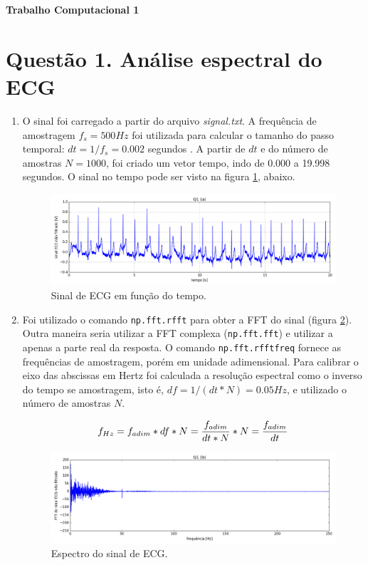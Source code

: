 \documentclass[12pt,letterpaper]{article}
\newcommand\hwnumber{1}
\begin{document}
\centerline{\textbf{\Large Trabalho Computacional \hwnumber}}

\centerline{}

\section*{Questão 1. Análise espectral do ECG}
\begin{enumerate}[label=(\alph*)]  %
    \item O sinal foi carregado a partir do arquivo \emph{signal.txt}. A frequência de amostragem ${f_s = 500 Hz}$ foi utilizada para calcular o tamanho do passo temporal: ${dt = 1/f_s = 0.002}$ segundos . A partir de ${dt}$ e do número de amostras ${N = 1000}$, foi criado um vetor tempo, indo de 0.000 a 19.998 segundos. O sinal no tempo pode ser visto na figura \ref{fig:1}, abaixo.
        \begin{figure}[H]
            \centering
            \includegraphics[width=15cm]{TC1/images/Q1_a_sinal_nfilt.png}
            \caption{Sinal de ECG em função do tempo.}
            \label{fig:1}
        \end{figure}

    \item
    Foi utilizado o comando \lstinline{np.fft.rfft} para obter a FFT do sinal (figura \ref{fig:2}). Outra maneira seria utilizar a FFT complexa (\lstinline{np.fft.fft}) e utilizar a apenas a parte real da resposta. O comando \lstinline{np.fft.rfftfreq} fornece as frequências de amostragem, porém em unidade adimensional. Para calibrar o eixo das abscissas em Hertz foi calculada a resolução espectral como o inverso do tempo se amostragem, isto é, ${df = {1/(dt*N)} = 0.05 Hz}$, e utilizado o número de amostras $N$.
    
    $${f_{Hz} = f_{adim}*df*N = {f_{adim} \over {dt*N}} *N = {f_{adim} \over dt}}$$
    
        \begin{figure}[H]
            \centering
            \includegraphics[width=15cm]{TC1/images/Q1_b_espectro_nfilt.png}
            \caption{Espectro do sinal de ECG.}
            \label{fig:2}
        \end{figure}
        

\end{enumerate}
\end{document}
